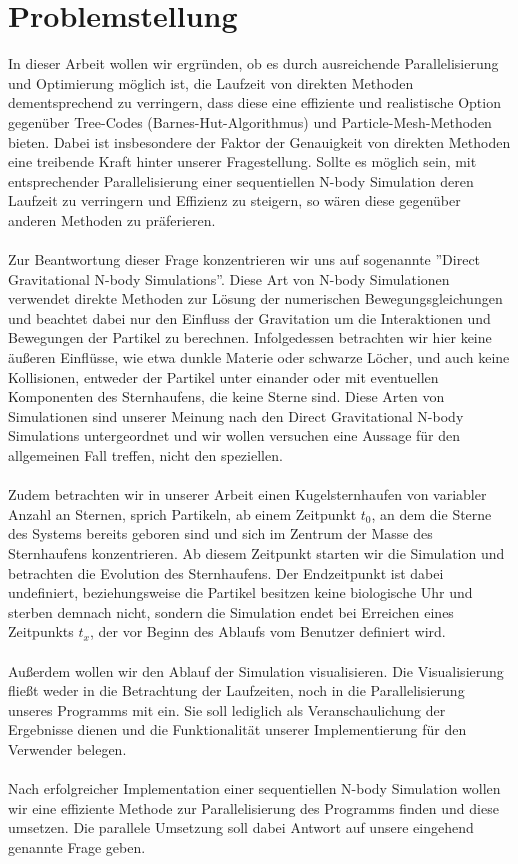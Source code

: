 \documentclass[
	12pt,
	a4paper,
	BCOR10mm,
	DIV14,
	headsepline,
	usegeometry,
]{scrreprt}
\begin{document}
\chapter{Problemstellung}
In dieser Arbeit wollen wir ergründen, ob es durch ausreichende Parallelisierung und Optimierung möglich ist, die Laufzeit von direkten Methoden dementsprechend zu verringern, dass diese eine effiziente und realistische Option gegenüber Tree-Codes (Barnes-Hut-Algorithmus) und Particle-Mesh-Methoden bieten. Dabei ist insbesondere der Faktor der Genauigkeit von direkten Methoden eine treibende Kraft hinter unserer Fragestellung. Sollte es möglich sein, mit entsprechender Parallelisierung einer sequentiellen N-body Simulation deren Laufzeit zu verringern und Effizienz zu steigern, so wären diese gegenüber anderen Methoden zu präferieren. \\\\ Zur Beantwortung dieser Frage konzentrieren wir uns auf sogenannte ''Direct Gravitational N-body Simulations''. Diese Art von N-body Simulationen verwendet direkte Methoden zur Lösung der numerischen Bewegungsgleichungen und beachtet dabei nur den Einfluss der Gravitation um die Interaktionen und Bewegungen der Partikel zu berechnen. Infolgedessen betrachten wir hier keine äußeren Einflüsse, wie etwa dunkle Materie oder schwarze Löcher, und auch keine Kollisionen, entweder der Partikel unter einander oder mit eventuellen Komponenten des Sternhaufens, die keine Sterne sind. Diese Arten von Simulationen sind unserer Meinung nach den Direct Gravitational N-body Simulations untergeordnet und wir wollen versuchen eine Aussage für den allgemeinen Fall treffen, nicht den speziellen. \\\\ Zudem betrachten wir in unserer Arbeit einen Kugelsternhaufen von variabler Anzahl an Sternen, sprich Partikeln, ab einem Zeitpunkt $ t_{0} $, an dem die Sterne des Systems bereits geboren sind und sich im Zentrum der Masse des Sternhaufens konzentrieren. Ab diesem Zeitpunkt starten wir die Simulation und betrachten die Evolution des Sternhaufens. Der Endzeitpunkt ist dabei undefiniert, beziehungsweise die Partikel besitzen keine biologische Uhr und sterben demnach nicht, sondern die Simulation endet bei Erreichen eines Zeitpunkts $ t_{x} $, der vor Beginn des Ablaufs vom Benutzer definiert wird. \\\\ Außerdem wollen wir den Ablauf der Simulation visualisieren. Die Visualisierung fließt weder in die Betrachtung der Laufzeiten, noch in die Parallelisierung unseres Programms mit ein. Sie soll lediglich als Veranschaulichung der Ergebnisse dienen und die Funktionalität unserer Implementierung für den Verwender belegen. \\\\ Nach erfolgreicher Implementation einer sequentiellen N-body Simulation wollen wir eine effiziente Methode zur Parallelisierung des Programms finden und diese umsetzen. Die parallele Umsetzung soll dabei Antwort auf unsere eingehend genannte Frage geben.
\end{document}
